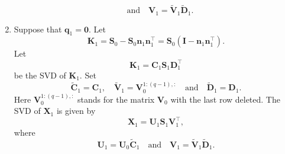 \documentclass[11pt,a4paper]{article}
\theoremstyle{mybreak}
\numberwithin{dummy}{section}
\theoremstyle{plain}
\theoremstyle{plain}
\theoremstyle{plain}
\theoremstyle{plain}
\theoremstyle{MyNonumberplain}
\newcommand{\0}{\M{0}}
\newcommand{\M}[1]{\mathbf{#1}}
\newcommand{\Mt}[1]{\tilde{\M{#1}}}
\newcommand{\T}{\top}
\newcommand{\ve}[1]{\mathbf{#1}}
\begin{document}
\begin{enumerate}[font=\upshape,label=(\roman*),wide,align=right]
\begin{displaymath}
    \quad
    \text{and}
    \quad
    \M{V}_1 = \Mt{V}_1 \Mt{D}_1.
  \end{displaymath}
\item Suppose that $\ve{q}_1 = \0$. Let
  \begin{displaymath}
    \M{K}_1
    =
    \M{S}_0 - \M{S}_0 \ve{n}_1 \ve{n}_1^\T
    =
    \M{S}_0 \left( \M{I} -  \ve{n}_1 \ve{n}_1^\T \right).
  \end{displaymath}
  Let
  \begin{displaymath}
    \M{K}_1 = \M{C}_1 \M{S}_1  \M{D}_1^\T
  \end{displaymath}
  be the SVD of $\M{K}_1$.  Set
  \begin{displaymath}
    \Mt{C}_1 = \M{C}_1,
    \quad
    \Mt{V}_1 = \M{V}_0^{1:(q - 1),:}
    \quad
    \text{and}
    \quad
    \Mt{D}_1 = \M{D}_1.
  \end{displaymath}
  Here $\M{V}_0^{1:(q - 1),:}$ stands for the matrix $\M{V}_0$ with the last row deleted. The SVD of $\M{X}_1$ is given by
  \begin{displaymath}
    \M{X}_1 = \M{U}_1 \M{S}_1\M{V}_1^\T,
  \end{displaymath}
  where
  \begin{displaymath}
    \M{U}_1 = \M{U}_0 \Mt{C}_1
    \quad
    \text{and}
    \quad
    \M{V}_1 = \Mt{V}_1 \Mt{D}_1.
  \end{displaymath}
\end{enumerate}
\end{document}
